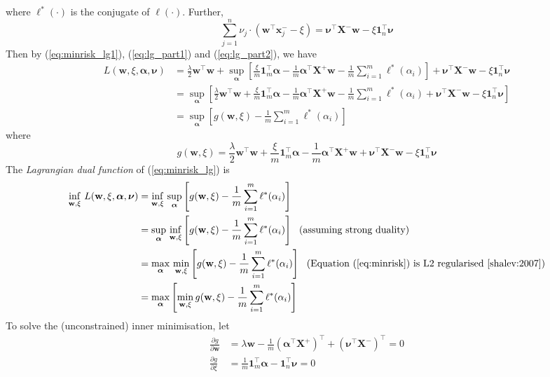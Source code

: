 \documentclass[9pt]{extarticle}
\newcommand{\x}{\mathbf{x}}
\newcommand{\X}{\mathbf{X}}
\newcommand{\1}{\mathbf{1}}
\newcommand{\w}{\mathbf{w}}
\newcommand{\alphabm}{\bm{\alpha}}
\newcommand{\nubm}{\bm{\nu}}
\begin{document}
where $\ell^*(\cdot)$ is the conjugate of $\ell(\cdot)$.
Further, 
\begin{equation}
\label{eq:lg_part2}
\sum_{j=1}^n \nu_j \cdot \left( \w^\top \x_j^- - \xi \right) = \nubm^\top \X^- \w - \xi \1_n^\top \nubm
\end{equation}
Then by (\ref{eq:minrisk_lg1}), (\ref{eq:lg_part1}) and (\ref{eq:lg_part2}), we have
\begin{align*}
L(\w, \xi, \alphabm, \nubm) 
&= \frac{\lambda}{2} \w^\top \w + 
   \sup_{\alphabm} \left[ \frac{\xi}{m} \1_m^\top \alphabm - \frac{1}{m} \alphabm^\top \X^+ \w - \frac{1}{m} \sum_{i=1}^m \ell^*(\alpha_i) \right] +
   \nubm^\top \X^- \w - \xi \1_n^\top \nubm \\
&= \sup_{\alphabm} \left[ 
   \frac{\lambda}{2} \w^\top \w + 
   \frac{\xi}{m} \1_m^\top \alphabm - \frac{1}{m} \alphabm^\top \X^+ \w - \frac{1}{m} \sum_{i=1}^m \ell^*(\alpha_i) +
   \nubm^\top \X^- \w - \xi \1_n^\top \nubm \right] \\
&= \sup_{\alphabm} \left[ g(\w, \xi) - \frac{1}{m} \sum_{i=1}^m \ell^*(\alpha_i) \right]
\end{align*}
where
$$g(\w, \xi) = \frac{\lambda}{2} \w^\top \w + \frac{\xi}{m} \1_m^\top \alphabm - \frac{1}{m} \alphabm^\top \X^+ \w + \nubm^\top \X^- \w - \xi \1_n^\top \nubm$$
The \emph{Lagrangian dual function} of (\ref{eq:minrisk_lg}) is
\begin{equation}
\label{eq:lg_dual_func}
\begin{aligned}
\inf_{\w, \xi} \, L(\w, \xi, \alphabm, \nubm) 
&= \inf_{\w, \xi}  \, \sup_{\alphabm} \left[ g(\w, \xi) - \frac{1}{m} \sum_{i=1}^m \ell^*(\alpha_i) \right] \\
&= \sup_{\alphabm} \, \inf_{\w, \xi} \left[ g(\w, \xi) - \frac{1}{m} \sum_{i=1}^m \ell^*(\alpha_i) \right] ~~ \text{(assuming strong duality)} \\
&= \max_{\alphabm} \, \min_{\w, \xi} \left[ g(\w, \xi) - \frac{1}{m} \sum_{i=1}^m \ell^*(\alpha_i) \right] ~~ \text{(Equation (\ref{eq:minrisk}) is L2 regularised~\cite{shalev:2007})} \\
&= \max_{\alphabm} \left[ \min_{\w, \xi} g(\w, \xi) - \frac{1}{m} \sum_{i=1}^m \ell^*(\alpha_i) \right]
\end{aligned}
\end{equation}
To solve the (unconstrained) inner minimisation, let
\begin{align*}
\frac{\partial g}{\partial \w}  &= \lambda \w - \frac{1}{m} \left( \alphabm^\top \X^+ \right)^\top + \left( \nubm^\top \X^- \right)^\top = 0 \\
\frac{\partial g}{\partial \xi} &= \frac{1}{m} \1_m^\top \alphabm - \1_n^\top \nubm = 0
\end{align*}
\end{document}
